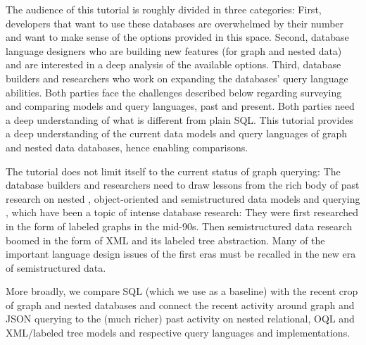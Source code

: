 The audience of this tutorial is roughly divided in three categories: First, developers that want to use these databases are overwhelmed by their number and want to make sense of the options provided in this space. Second, database language designers who are building new features (for graph and nested data) and are interested in a deep analysis of the available options. Third, database builders and researchers who work on expanding the databases' query language abilities. Both parties face the challenges described below regarding surveying and comparing models and query languages, past and present. Both parties need a deep understanding of what is different from plain SQL. This tutorial provides a deep understanding of the current data models and query languages of graph and nested data databases, hence enabling comparisons. 

The tutorial does not limit itself to the current status of graph querying: The database builders and researchers need to draw lessons from the rich body of past research on nested \cite{nest-unnest-pods-1982,nested-relational-vldb-1988,nested-relational-workshop-lncs-1989}, object-oriented \cite{oql-dbpl-1989} and semistructured data models and querying \cite{xml-ql-computer-networks-1999,xml-query-language-survey-sigmod-record-2000,xquery-3.0-w3c-2013}, which have been a topic of intense database research: They were first researched in the form of labeled graphs in the mid-90s. Then semistructured data research boomed in the form of XML and its labeled tree abstraction. 
Many of the important language design issues of the first eras must be recalled in the new era of semistructured data.

More broadly, we compare SQL (which we use as a baseline) with the recent crop of graph and nested databases and connect the recent activity around graph and JSON querying to the (much richer) past activity on nested relational, OQL and XML/labeled tree models and respective query languages and implementations. 

